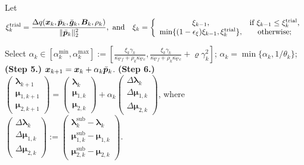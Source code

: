 \documentclass[aos]{imsart}
\numberwithin{equation}{section}
\theoremstyle{plain}
\begin{document}
\begin{algorithm}[htb]
\begin{algorithmic}[1]
  \STATE Let 
  \begin{equation*}
      \xi_{k}^{\text{trial}} =  \frac{\Delta q(\bm{x}_k,\Bar{\bm{p}}_k, \Bar{\bm{g}}_k,\bm{B}_k,\rho_k)}{\|\Bar{\bm{p}}_k\|_2^2}, 
      ~\text{and} \quad
       \xi_k = \left\{ \begin{array}{cc}
          \xi_{k-1}, & \text{if}~\xi_{k-1} \leq \xi_{k}^{\text{trial}},  \\
          \min\{(1-\epsilon_{\xi})\xi_{k-1},\xi_{k}^{\text{trial}}\},  & \text{otherwise;}
      \end{array} \right.
  \end{equation*}
 
  \STATE Select $\alpha_k \in \left[\alpha_k^{\text{min}}, \alpha_k^{\max} \right] :=  \left[ \frac{ \xi_{k}\gamma_k}{\kappa_{\nabla f} + \rho_k \kappa_{\nabla c}} , \frac{ \xi_{k}\gamma_k}{\kappa_{\nabla f} + \rho_k \kappa_{\nabla c}} + \varrho \gamma_k^2 \right]$;
  \STATE $\alpha_k = \min\{\alpha_k,1/\theta_k\}$;
  \STATE \textbf{(Step 5.)} $\bm{x}_{k+1} = \bm{x}_{k} + \alpha_k \Bar{\bm{p}}_{k}$.
  \STATE \textbf{(Step 6.)} $ \left( \begin{array}{c}
         \bm{\lambda}_{k+1} \\
         \bm{\mu}_{1,k+1} \\
         \bm{\mu}_{2,k+1}
    \end{array} \right) = \left( \begin{array}{c}
         \bm{\lambda}_{k} \\
         \bm{\mu}_{1,k} \\
         \bm{\mu}_{2,k}
    \end{array} \right) + \alpha_k \left( \begin{array}{c}
         \Delta \bm{\lambda}_{k} \\
         \Delta \bm{\mu}_{1,k} \\
         \Delta \bm{\mu}_{2,k}
    \end{array} \right)$, where $\left( \begin{array}{c}
         \Delta \bm{\lambda}_{k} \\
         \Delta \bm{\mu}_{1,k} \\
         \Delta \bm{\mu}_{2,k}
    \end{array} \right) := \left( \begin{array}{c}
         \bm{\lambda}_k^{\text{sub}} - \bm{\lambda}_{k} \\
         \bm{\mu}_{1,k}^{\text{sub}} - \bm{\mu}_{1,k} \\
         \bm{\mu}_{2,k}^{\text{sub}} - \bm{\mu}_{2,k}
    \end{array} \right).$
  \ENDFOR
 \end{algorithmic}
 \end{algorithm}
 
\end{document}
